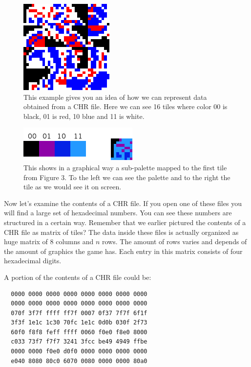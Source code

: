\documentclass{article}
\begin{document}
\begin{figure}[h]
\centering
\includegraphics[scale=0.5]{graphics}
\caption{This example gives you an idea of how we can represent data obtained from a CHR file. Here we can see 16 tiles where color 00 is black, 01 is red, 10 blue and 11 is white.}
\end{figure}

\begin{figure}[h]
\centering
\includegraphics[scale=0.5]{mapping}
\caption{This shows in a graphical way a sub-palette mapped to the first tile from Figure 3. To the left we can see the palette and to the right the tile as we would see it on screen.}
\end{figure}

\vskip 0.2in

Now let's examine the contents of a CHR file. If you open one of these files you will find a large set of hexadecimal numbers. You can see these numbers are structured in a certain way. Remember that we earlier pictured the contents of a CHR file as matrix of tiles? The data inside these files is actually organized as huge matrix of 8 columns and $n$ rows. The amount of rows varies and depends of the amount of graphics the game has. Each entry in this matrix consists of four hexadecimal digits.

A portion of the contents of a CHR file could be:

\begin{lstlisting}
  0000 0000 0000 0000 0000 0000 0000 0000
  0000 0000 0000 0000 0000 0000 0000 0000
  070f 3f7f ffff ff7f 0007 0f37 7f7f 6f1f
  3f3f 1e1c 1c30 70fc 1e1c 0d0b 030f 2f73
  60f0 f8f8 feff ffff 0060 f0e0 f8e0 8000
  c033 73f7 f7f7 3241 3fcc be49 4949 ffbe
  0000 0000 f0e0 d0f0 0000 0000 0000 0000
  e040 8080 80c0 6070 0080 0000 0000 80a0
\end{lstlisting}
\end{document}
